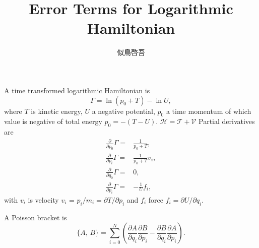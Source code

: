 \documentclass[11pt]{jsarticle}
\title{Error Terms for Logarithmic Hamiltonian}
\author{似鳥啓吾}
\begin{document}
\maketitle

A time transformed logarithmic Hamiltonian is
\begin{equation}
\Gamma = \ln (p_0 + T) - \ln U,
\end{equation}
where $T$ is kinetic energy, $U$ a negative potential,
$p_0$ a time momentum of which value is negative of
total energy $p_0 = -(T - U)$.
$\mathcal H = \mathcal T + \mathcal V$
Partial derivatives are
\begin{subequations}
\begin{align}
\frac{\partial}{\partial p_0} \Gamma =& \frac{1}{p_0 + T}, \\
\frac{\partial}{\partial p_i} \Gamma =& \frac{1}{p_0 + T} v_i, \\ %
\frac{\partial}{\partial q_0} \Gamma =& 0, \\
\frac{\partial}{\partial p_i} \Gamma =& -\frac{1}{U} f_i,
\end{align}
\end{subequations}
with $v_i$ is velocity $v_i$ = $p_i / m_i = \partial T / \partial p_i$
and $f_i$ force $f_i = \partial U / \partial q_i$.

A Poisson bracket is
\begin{equation}
\{ A,\, B \} = \sum_{i=0}^N
\left(
\frac{\partial A}{\partial q_i}
\frac{\partial B}{\partial p_i}
-
\frac{\partial B}{\partial q_i}
\frac{\partial A}{\partial p_i}
\right).
\end{equation}
\end{document}
